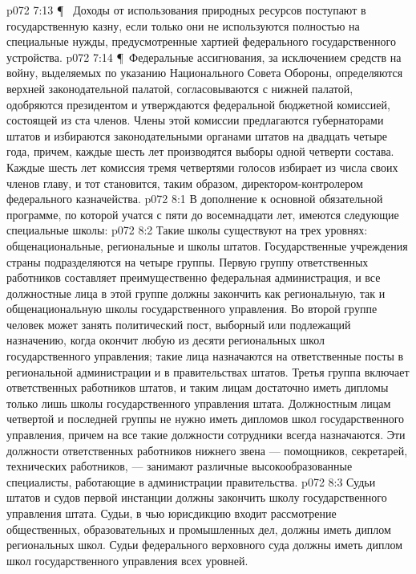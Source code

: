 \vs p072 7:13 \P\ \bibnobreakspace {} Доходы от использования природных ресурсов поступают в государственную казну, если только они не используются полностью на специальные нужды, предусмотренные хартией федерального государственного устройства.
\vs p072 7:14 \P\ Федеральные ассигнования, за исключением средств на войну, выделяемых по указанию Национального Совета Обороны, определяются верхней законодательной палатой, согласовываются с нижней палатой, одобряются президентом и утверждаются федеральной бюджетной комиссией, состоящей из ста членов. Члены этой комиссии предлагаются губернаторами штатов и избираются законодательными органами штатов на двадцать четыре года, причем, каждые шесть лет производятся выборы одной четверти состава. Каждые шесть лет комиссия тремя четвертями голосов избирает из числа своих членов главу, и тот становится, таким образом, директором\hyp{}контролером федерального казначейства.
\vs p072 8:1 В дополнение к основной обязательной программе, по которой учатся с пяти до восемнадцати лет, имеются следующие специальные школы:
\vs p072 8:2 \bibnobreakspace {} Такие школы существуют на трех уровнях: общенациональные, региональные и школы штатов. Государственные учреждения страны подразделяются на четыре группы. Первую группу ответственных работников составляет преимущественно федеральная администрация, и все должностные лица в этой группе должны закончить как региональную, так и общенациональную школы государственного управления. Во второй группе человек может занять политический пост, выборный или подлежащий назначению, когда окончит любую из десяти региональных школ государственного управления; такие лица назначаются на ответственные посты в региональной администрации и в правительствах штатов. Третья группа включает ответственных работников штатов, и таким лицам достаточно иметь дипломы только лишь школы государственного управления штата. Должностным лицам четвертой и последней группы не нужно иметь дипломов школ государственного управления, причем на все такие должности сотрудники всегда назначаются. Эти должности ответственных работников нижнего звена --- помощников, секретарей, технических работников, --- занимают различные высокообразованные специалисты, работающие в администрации правительства.
\vs p072 8:3 Судьи штатов и судов первой инстанции должны закончить школу государственного управления штата. Судьи, в чью юрисдикцию входит рассмотрение общественных, образовательных и промышленных дел, должны иметь диплом региональных школ. Судьи федерального верховного суда должны иметь диплом школ государственного управления всех уровней.
